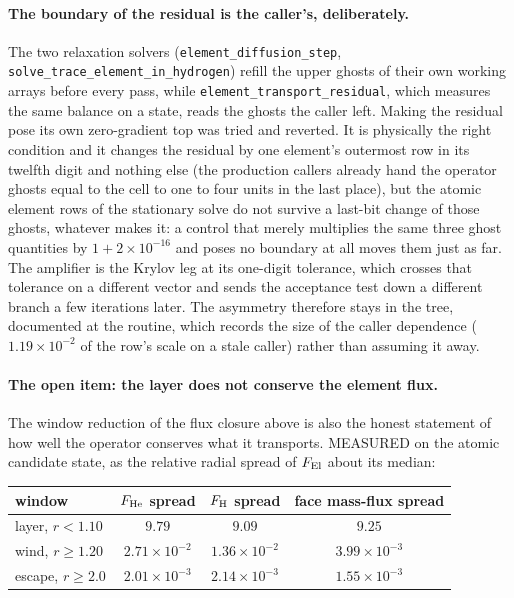 \documentclass[english,a4paper]{my_memo}
\begin{document}
\paragraph{The boundary of the residual is the caller's, deliberately.} The
two relaxation solvers (\texttt{element\_diffusion\_step},
\texttt{solve\_trace\_element\_in\_hydrogen}) refill the upper ghosts of
their own working arrays before every pass, while
\texttt{element\_transport\_residual}, which measures the same balance on a
state, reads the ghosts the caller left. Making the residual pose its own
zero-gradient top was tried and reverted. It is physically the right
condition and it changes the residual by one element's outermost row in its
twelfth digit and nothing else (the production callers already hand the
operator ghosts equal to the cell to one to four units in the last place),
but the atomic element rows of the stationary solve do not survive a
last-bit change of those ghosts, whatever makes it: a control that merely
multiplies the same three ghost quantities by $1 + 2\times10^{-16}$ and poses
no boundary at all moves them just as far. The amplifier is the Krylov leg
at its one-digit tolerance, which crosses that tolerance on a different
vector and sends the acceptance test down a different branch a few
iterations later. The asymmetry therefore stays in the tree, documented at
the routine, which records the size of the caller dependence
($1.19\times10^{-2}$ of the row's scale on a stale caller) rather than
assuming it away.

\paragraph{The open item: the layer does not conserve the element flux.} The
window reduction of the flux closure above is also the honest statement of
how well the operator conserves what it transports. MEASURED on the atomic
candidate state, as the relative radial spread of $F_{\rm El}$ about its
median:

\begin{center}\small
\begin{tabular}{@{}lccc@{}}
\toprule
window & $F_{\rm He}$ spread & $F_{\rm H}$ spread & face mass-flux spread \\
\midrule
layer, $r < 1.10$        & $9.79$               & $9.09$               & $9.25$ \\
wind, $r \ge 1.20$       & $2.71\times10^{-2}$  & $1.36\times10^{-2}$  & $3.99\times10^{-3}$ \\
escape, $r \ge 2.0$      & $2.01\times10^{-3}$  & $2.14\times10^{-3}$  & $1.55\times10^{-3}$ \\
\bottomrule
\end{tabular}
\end{center}
\end{document}
